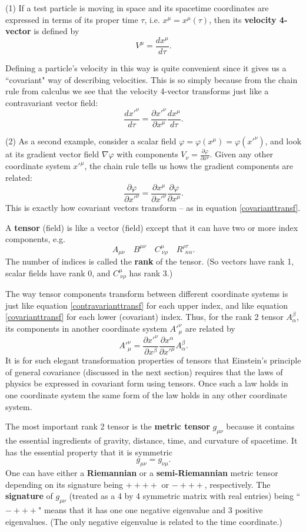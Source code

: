 \documentclass[12pt,reqno]{amsart}
\theoremstyle{definition}
\numberwithin{equation}{section}
\begin{document}
(1) If a test particle is moving in space and its spacetime coordinates are expressed in terms of its proper time $\tau$, i.e. $x^\mu = x^\mu(\tau)$, then its {\bf velocity 4-vector} is defined by 
$$V^\mu = \frac{dx^\mu}{d\tau}.$$ 

Defining a particle's velocity in this way is quite convenient since it gives us a ``covariant" way of describing velocities. This is so simply because from the chain rule from calculus we see that the velocity 4-vector transforms just like a contravariant vector field:
\[
\frac{dx'^\nu}{d\tau} = 
\frac{\partial x'^\nu}{\partial x^\mu} \frac{dx^\mu}{d\tau}.
\]

(2) As a second example, consider a scalar field $\varphi = \varphi(x^\mu) = \varphi(x'^\nu)$, and look at its gradient vector field $\nabla\varphi$ with components
$V_\nu = \frac{\partial \varphi}{\partial x^\nu}$. Given any other coordinate system $x'^\mu$, the chain rule tells us hows the gradient components are related:
\[
\frac{\partial \varphi}{\partial x'^\nu} = 
\frac{\partial x^\mu}{\partial x'^\nu} \frac{\partial \varphi}{\partial x^\mu}.
\]
This is exactly how covariant vectors transform -- as in equation \eqref{covarianttransf}.

\medskip

A {\bf tensor} (field) is like a vector (field) except that it can have two or more index components, e.g. $$A_{\mu\nu} \quad B^{\mu\nu} \quad C^\mu_{\ \nu\rho} \quad R^{\rho\tau}_{\ \ \kappa\alpha}.$$
The number of indices is called the {\bf rank} of the tensor. (So vectors have rank 1, scalar fields have rank 0, and $C^\mu_{\ \nu\rho}$ has rank 3.)

The way tensor components transform between different coordinate systems is just like equation \eqref{contravarianttransf} for each upper index, and like equation \eqref{covarianttransf} for each lower (covariant) index. Thus, for the rank 2 tensor $A_{\alpha}^\beta$, its components in another coordinate system $A'^\nu_\mu$ are related by
\[
A'^\nu_{\mu} = 
\frac{\partial x'^\nu}{\partial x^\beta}
\frac{\partial x^\alpha}{\partial x'^\mu}
A_{\alpha}^\beta.
\]
It is for such elegant transformation properties of tensors that Einstein's principle of general covariance (discussed in the next section) requires that the laws of physics be expressed in covariant form using tensors. Once such a law holds in one coordinate system the same form of the law holds in any other coordinate system.

\medskip

The most important rank 2 tensor is the {\bf metric tensor} $g_{\mu\nu}$ because it contains the essential ingredients of gravity, distance, \newline time, and curvature of spacetime. It has the essential property that it is symmetric
\[
g_{\mu\nu} = g_{\nu\mu}.
\]
One can have either a {\bf Riemannian} or a {\bf semi-Riemannian} metric tensor depending on its signature being $++++$ or $-+++$, respectively. The {\bf signature} of $g_{\mu\nu}$ (treated as a 4 by 4 symmetric matrix with real entries) being ``$-+++$" means that it has one one negative eigenvalue and 3 positive eigenvalues. (The only negative eigenvalue is related to the time coordinate.)
\end{document}
